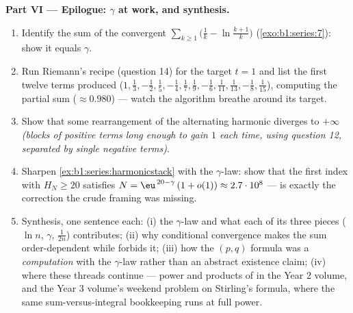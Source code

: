 \begin{problem}[{Weekend problem --- $H_n = \ln n + \gamma +
\frac{1}{2n} + O(n^{-2})$, and rearranging $1 - \frac12 +
\frac13 - \dots$ to $\frac{\ln 2}{2}$}]
\medskip
\noindent\textbf{Part VI --- Epilogue: $\gamma$ at work, and
synthesis.}
\begin{enumerate}[resume]
  \item Identify the sum of the convergent 
        $\sum_{k\geq1} \bigl(\frac1k - \ln\frac{k+1}{k}\bigr)$
        (\cref{exo:b1:series:7}): show it equals $\gamma$.
  \item Run Riemann's recipe (question 14) for the target $t =
        1$ and list the first twelve terms produced ($1, \frac13,
        -\frac12, \frac15, -\frac14, \frac17, \frac19, -\frac16,
        \frac1{11}, \frac1{13}, -\frac18, \frac1{15}$),
        computing the partial sum ($\approx 0.980$) --- watch
        the algorithm breathe around its target.
  \item Show that some rearrangement of the alternating harmonic
         diverges to $+\infty$ \emph{(blocks of positive
        terms long enough to gain $1$ each time, using question
        12, separated by single negative terms)}.
  \item Sharpen \cref{ex:b1:series:harmonicstack} with the
        $\gamma$-law: show that the first index with $H_N \geq
        20$ satisfies $N = \eu^{\,20 - \gamma}\,(1 + o(1))
        \approx 2.7\cdot10^{8}$ ---  is exactly
        the correction the crude framing was missing.
  \item Synthesis, one sentence each: (i) the $\gamma$-law and
        what each of its three pieces ($\ln n$, $\gamma$,
        $\frac{1}{2n}$) contributes; (ii) why conditional
        convergence makes the sum order-dependent while  forbids it; (iii) how the $(p,q)$ formula
        was a \emph{computation} with the $\gamma$-law rather
        than an abstract existence claim; (iv) where these
        threads continue --- power  and products of 
        in the Year 2 volume, and the Year 3 volume's weekend
        problem on Stirling's formula, where the same
        sum-versus-integral bookkeeping runs at full power.
\end{enumerate}
\end{problem}

